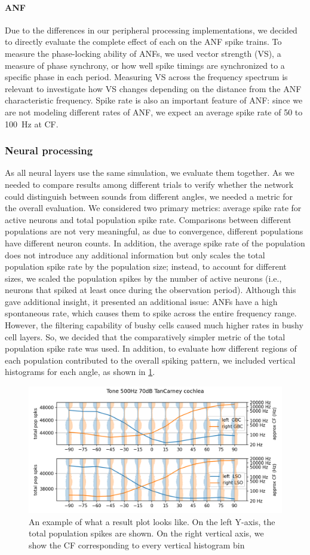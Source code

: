\documentclass[11pt,a4paper]{article}
\begin{document}
\paragraph{ANF}\label{methods:anf}
Due to the differences in our peripheral processing implementations, we decided to directly evaluate the complete effect of each on the ANF spike trains. To measure the phase-locking ability of ANFs, we used vector strength (VS), a measure of phase synchrony, or how well spike timings are synchronized to a specific phase in each period. Measuring VS across the frequency spectrum is relevant to investigate how VS changes depending on the distance from the ANF characteristic frequency. Spike rate is also an important feature of ANF: since we are not modeling different rates of ANF, we expect an average spike rate of 50 to \qty{100}{\hertz} at CF.

\subsubsection{Neural processing}\label{met:neural}
As all neural layers use the same simulation, we evaluate them together. As we needed to compare results among different trials to verify whether the network could distinguish between sounds from different angles, we needed a metric for the overall evaluation. We considered two primary metrics: average spike rate for active neurons and total population spike rate. Comparisons between different populations are not very meaningful, as due to convergence, different populations have different neuron counts. In addition, the average spike rate of the population does not introduce any additional information but only scales the total population spike rate by the population size; instead, to account for different sizes, we scaled the population spikes by the number of active neurons (i.e., neurons that spiked at least once during the observation period). Although this gave additional insight, it presented an additional issue: ANFs have a high spontaneous rate, which causes them to spike across the entire frequency range. However, the filtering capability of bushy cells caused much higher rates in bushy cell layers. So, we decided that the comparatively simpler metric of the total population spike rate was used. In addition, to evaluate how different regions of each population contributed to the overall spiking pattern, we included vertical histograms for each angle, as shown in \ref{fig:rate-vs-angle}.

\begin{figure}[H]
    \centering
    \includegraphics[width=0.5\linewidth]{Images/rate_vs_angle.png}
    \caption{An example of what a result plot looks like. On the left Y-axis, the total population spikes are shown. On the right vertical axis, we show the CF corresponding to every vertical histogram bin}
    \label{fig:rate-vs-angle}
\end{figure}
\end{document}
